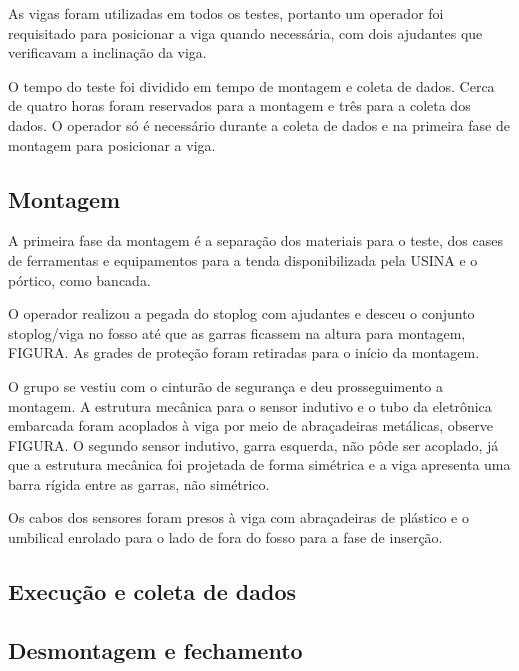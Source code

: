 As vigas foram utilizadas em todos os testes, portanto um operador foi
requisitado para posicionar a viga quando necessária, com dois ajudantes que
verificavam a inclinação da viga.

O tempo do teste foi dividido em tempo de montagem e coleta de dados. Cerca de
quatro horas foram reservados para a montagem e três para a coleta dos dados.
O operador só é necessário durante a coleta de dados e na primeira fase de
montagem para posicionar a viga.

\subsection{Montagem}
A primeira fase da montagem é a separação dos materiais para o teste, dos cases
de ferramentas e equipamentos para a tenda disponibilizada pela USINA e o
pórtico, como bancada.

O operador realizou a pegada do stoplog com ajudantes e desceu o conjunto
stoplog/viga no fosso até que as garras ficassem na altura para montagem,
FIGURA.
As grades de proteção foram retiradas para o início da montagem.

O grupo se vestiu com o cinturão de segurança e deu prosseguimento a
montagem. A estrutura mecânica para o sensor indutivo e o
tubo da eletrônica embarcada foram acoplados à viga por meio de abraçadeiras
metálicas, observe FIGURA. O segundo sensor indutivo, garra esquerda, não pôde
ser acoplado, já que a estrutura mecânica foi projetada de forma simétrica e a
viga apresenta uma barra rígida entre as garras, não simétrico.

Os cabos dos sensores foram presos à viga com abraçadeiras de plástico e o
umbilical enrolado para o lado de fora do fosso para a fase de inserção.



\subsection{Execução e coleta de dados}
\subsection{Desmontagem e fechamento}

\label{metodos}


